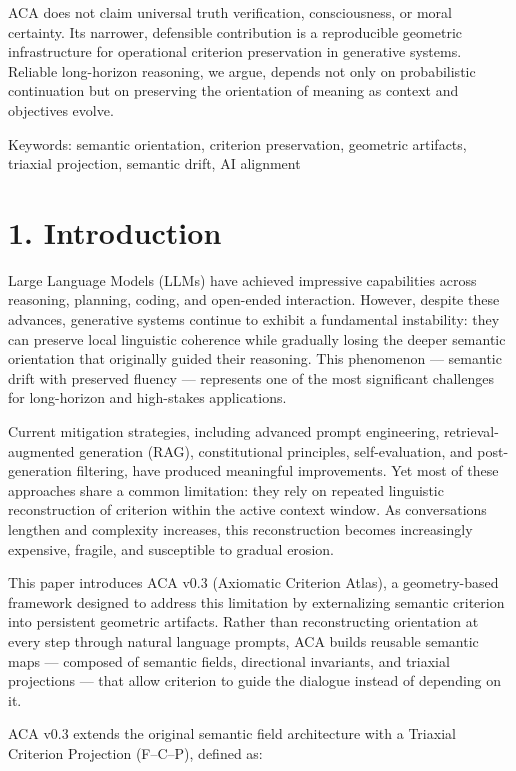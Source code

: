\documentclass[11pt]{article}
\begin{document}
ACA does not claim universal truth verification, consciousness, or moral certainty. Its narrower, defensible contribution is a reproducible geometric infrastructure for operational criterion preservation in generative systems. Reliable long-horizon reasoning, we argue, depends not only on probabilistic continuation but on preserving the orientation of meaning as context and objectives evolve.

Keywords: semantic orientation, criterion preservation, geometric artifacts, triaxial projection, semantic drift, AI alignment

\section{1. Introduction}

Large Language Models (LLMs) have achieved impressive capabilities across reasoning, planning, coding, and open-ended interaction. However, despite these advances, generative systems continue to exhibit a fundamental instability: they can preserve local linguistic coherence while gradually losing the deeper semantic orientation that originally guided their reasoning. This phenomenon — semantic drift with preserved fluency — represents one of the most significant challenges for long-horizon and high-stakes applications.

Current mitigation strategies, including advanced prompt engineering, retrieval-augmented generation (RAG), constitutional principles, self-evaluation, and post-generation filtering, have produced meaningful improvements. Yet most of these approaches share a common limitation: they rely on repeated linguistic reconstruction of criterion within the active context window. As conversations lengthen and complexity increases, this reconstruction becomes increasingly expensive, fragile, and susceptible to gradual erosion.

This paper introduces ACA v0.3 (Axiomatic Criterion Atlas), a geometry-based framework designed to address this limitation by externalizing semantic criterion into persistent geometric artifacts. Rather than reconstructing orientation at every step through natural language prompts, ACA builds reusable semantic maps — composed of semantic fields, directional invariants, and triaxial projections — that allow criterion to guide the dialogue instead of depending on it.

ACA v0.3 extends the original semantic field architecture with a Triaxial Criterion Projection (F–C–P), defined as:
\end{document}
